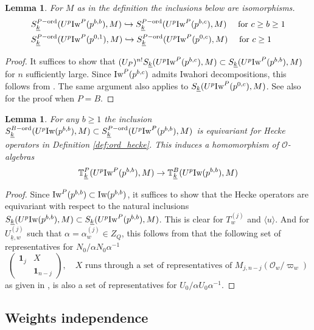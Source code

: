 \documentclass[leqno]{amsart}
\newtheorem{lem}[thm]{Lemma}
\theoremstyle{definition}
\theoremstyle{remark}
\newcommand{\id}{\mathbf{1}}
\newcommand{\oo}{\mathcal{O}}
\newcommand{\wt}[1]{\underline{ #1 }}
\newcommand{\Iw}{\textnormal{Iw}} %
\newcommand{\TT}{\mathbb{T}} %
\newcommand{\ord}{\textnormal{ord}} %
\begin{document}
\begin{lem}\label{lem:control}
	For $M$ as in the definition
	the inclusions below are isomorphisms.
	\begin{align*}
	&S_{\wt{k}}^{P-\ord}(U^p\Iw^P(p^{b,b}),M)\hookrightarrow	
	S_{\wt{k}}^{P-\ord}(U^p\Iw^P(p^{b,c}),M)\quad 
	\text{ for } c\geq b\geq 1\\
	&S_{\wt{k}}^{P-\ord}(U^p\Iw^P(p^{0,1}),M)\hookrightarrow	
	S_{\wt{k}}^{P-\ord}(U^p\Iw^P(p^{0,c}),M)\quad \text{ for } c\geq 1
	\end{align*}
\end{lem}
\begin{proof}
	It suffices to show that 
	$(U_P)^{n!}S_{\wt{k}}(U^p\Iw^P(p^{b,c}),M)
	\subset S_{\wt{k}}(U^p\Iw^P(p^{b,b}),M)$
	for $n$ sufficiently large. 
	Since $\Iw^P(p^{b,c})$ admits Iwahori decompositions,
	this follows from \cite[Lem 3.3.2]{emeI}.
	The same argument also applies to 
	$S_{\wt{k}}(U^p\Iw^P(p^{0,c}),M)$.
	See also \cite[Lem 2.19]{ger} for the proof when $P=B$.
\end{proof}

\begin{lem}\label{lem:PtoB}
	For any $b\geq 1$
	the inclusion 
	$S_{\wt{k}}^{B-\ord}(U^p\Iw(p^{b,b}),M)\subset
	S_{\wt{k}}^{P-\ord}(U^p\Iw^P(p^{b,b}),M)$
	is equivariant
	for Hecke operators in 
	Definition \ref{def:ord_hecke}.
	This induces a homomorphism of $\oo$-algebras
	\[
		\TT^P_{\wt{k}}(U^p\Iw^P(p^{b,b}),M)\to
		\TT^B_{\wt{k}}(U^p\Iw(p^{b,b}),M)
	\]
\end{lem}
\begin{proof}
	Since $\Iw^P(p^{b,b})\subset \Iw(p^{b,b})$,
	it suffices to show that the Hecke operators 
	are equivariant with respect to the natural inclusions
	$S_{\wt{k}}(U^p\Iw(p^{b,b}),M)\subset 
	S_{\wt{k}}(U^p\Iw^P(p^{b,b}),M)$.
	This is clear for $T_w^{(j)}$ and $\langle u\rangle$.
	And for  $U_{\wt{k},w}^{(j)}$ such that 
	$\alpha=\alpha_w^{(j)}\in Z_Q$, this follows from that 
	the following set of representatives for 
	$N_0/\alpha N_0\alpha^{-1}$
	\[
	\begin{pmatrix}
		\id_j&X\\&\id_{n-j}
	\end{pmatrix},\quad
	X \text{ runs through a set of representatives of }
	M_{j,n-j}(\oo_w/\varpi_w)
	\]
	as given in \cite[Lem 2.10]{ger}, is also
	a set of representatives for 
	$U_0/\alpha U_0\alpha^{-1}$.
\end{proof}

\subsection{Weights independence}
\end{document}
